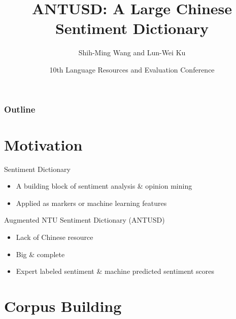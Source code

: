 \documentclass[compress]{beamer}
\title{ANTUSD: A Large Chinese Sentiment Dictionary }
\author{Shih-Ming Wang and Lun-Wei Ku}
\date[LREC 2016]{10th Language Resources and Evaluation Conference}
\begin{document}
\beamertemplatenavigationsymbolsempty

\begin{frame}[plain]
    \titlepage
\end{frame}

\begin{frame}
    \frametitle{Outline}
    \tableofcontents %
\end{frame}
\section{Motivation}
    \begin{frame}{\secname}
        \begin{block}{Sentiment Dictionary}
            \begin{itemize}
                \item A building block of sentiment analysis \& opinion mining
                \item Applied as markers or machine learning features
            \end{itemize}
        \end{block}
        \pause
        \begin{block}{Augmented NTU Sentiment Dictionary (ANTUSD)}
            \begin{itemize}
                \item Lack of Chinese resource
                \item Big \& complete
                \item Expert labeled sentiment \& machine predicted sentiment scores
            \end{itemize}
        \end{block}
    \end{frame}

\section{Corpus Building}
\end{document}
